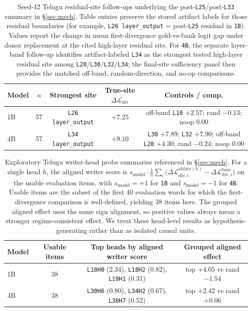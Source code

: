\documentclass{article}
\begin{document}
\begin{table}[t]
\centering
\small
\setlength{\tabcolsep}{5pt}
\begin{tabular}{lcccc}
\toprule
\textbf{Model} & \textbf{$n$} & \textbf{Strongest site} & \textbf{True-site $\Delta \mathcal{L}_{\mathrm{div}}$} & \textbf{Controls / comp.} \\
\midrule
1B & 57 & \texttt{L26 layer\_output} & $+7.25$ & off-band \texttt{L10} $+2.57$; rand $-0.13$; noop $0.00$ \\
4B & 57 & \texttt{L34 layer\_output} & $+9.10$ & \texttt{L30} $+7.89$, \texttt{L32} $+7.90$; off-band \texttt{L20} $+4.30$; rand $-0.24$; noop $0.00$ \\
\bottomrule
\end{tabular}
\caption{Seed-42 Telugu residual-site follow-ups underlying the post-\texttt{L25}/post-\texttt{L33} summary in \S\ref{sec:mech}. Table entries preserve the stored artifact labels for those residual boundaries (for example, \texttt{L26 layer\_output} = post-\texttt{L25} residual in \texttt{1B}). Values report the change in mean first-divergence gold-vs-bank logit gap under donor replacement at the cited high-layer residual site. For \texttt{4B}, the separate layer-band follow-up identifies artifact-labeled \texttt{L34} as the strongest tested high-layer residual site among \texttt{L20}/\texttt{L30}/\texttt{L32}/\texttt{L34}; the final-site sufficiency panel then provides the matched off-band, random-direction, and no-op comparisons.}
\label{tab:telugu_late_sites}
\end{table}

\begin{table}[t]
\centering
\small
\setlength{\tabcolsep}{7pt}
\begin{tabular}{lccc}
\toprule
\textbf{Model} & \textbf{Usable items} & \textbf{Top heads by aligned writer score} & \textbf{Grouped aligned effect} \\
\midrule
1B & 38 & \texttt{L18H0} (2.34), \texttt{L18H2} (0.82), \texttt{L19H1} (0.31) & top $+4.05$ vs rand $-1.54$ \\
4B & 38 & \texttt{L30H6} (0.80), \texttt{L34H2} (0.67), \texttt{L30H7} (0.52) & top $+2.42$ vs rand $+0.06$ \\
\bottomrule
\end{tabular}
\caption{Exploratory Telugu writer-head probe summaries referenced in \S\ref{sec:mech}. For a single head $h$, the aligned writer score is $s_{\mathrm{model}} \cdot \frac{1}{n}\sum_i \big(\Delta \mathcal{L}^{\mathrm{ablate}(h)}_{\mathrm{div},i} - \Delta \mathcal{L}^{\mathrm{base}}_{\mathrm{div},i}\big)$ on the usable evaluation items, with $s_{\mathrm{model}}{=}+1$ for \texttt{1B} and $s_{\mathrm{model}}{=}-1$ for \texttt{4B}. Usable items are the subset of the first 40 evaluation words for which the first-divergence comparison is well-defined, yielding 38 items here. The grouped aligned effect uses the same sign alignment, so positive values always mean a stronger regime-consistent effect. We treat these head-level results as hypothesis-generating rather than as isolated causal units.}
\label{tab:telugu_writer_heads}
\end{table}
\end{document}
